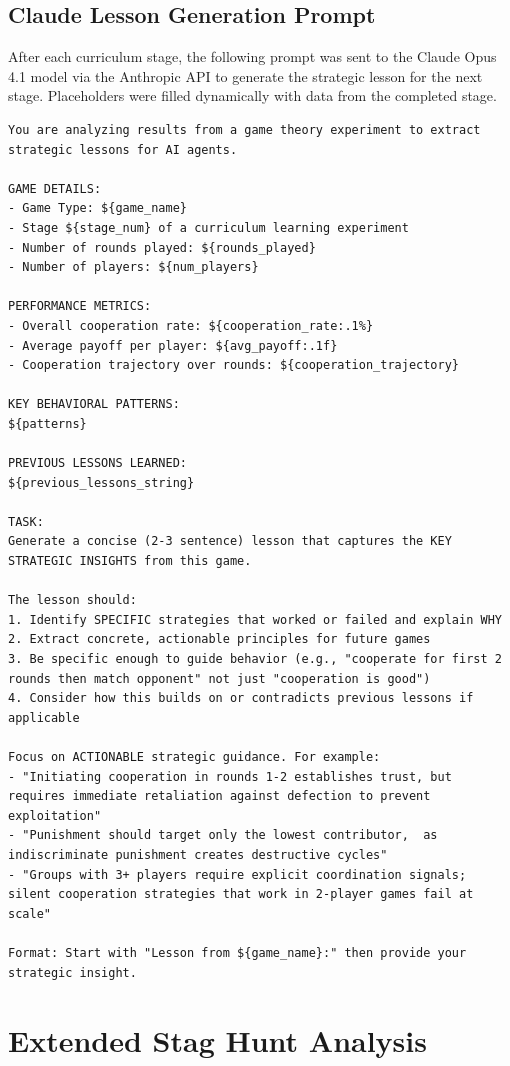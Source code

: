 \documentclass[11pt]{article}
\begin{document}
\subsection{Claude Lesson Generation Prompt}
\label{app:lesson_prompt}
After each curriculum stage, the following prompt was sent to the Claude Opus 4.1 model via the Anthropic API to generate the strategic lesson for the next stage. Placeholders were filled dynamically with data from the completed stage.

\begin{lstlisting}
You are analyzing results from a game theory experiment to extract strategic lessons for AI agents.

GAME DETAILS:
- Game Type: ${game_name}
- Stage ${stage_num} of a curriculum learning experiment
- Number of rounds played: ${rounds_played}
- Number of players: ${num_players}

PERFORMANCE METRICS:
- Overall cooperation rate: ${cooperation_rate:.1%}
- Average payoff per player: ${avg_payoff:.1f}
- Cooperation trajectory over rounds: ${cooperation_trajectory}

KEY BEHAVIORAL PATTERNS:
${patterns}

PREVIOUS LESSONS LEARNED:
${previous_lessons_string}

TASK:
Generate a concise (2-3 sentence) lesson that captures the KEY STRATEGIC INSIGHTS from this game.

The lesson should:
1. Identify SPECIFIC strategies that worked or failed and explain WHY
2. Extract concrete, actionable principles for future games
3. Be specific enough to guide behavior (e.g., "cooperate for first 2 rounds then match opponent" not just "cooperation is good")
4. Consider how this builds on or contradicts previous lessons if applicable

Focus on ACTIONABLE strategic guidance. For example:
- "Initiating cooperation in rounds 1-2 establishes trust, but requires immediate retaliation against defection to prevent exploitation"
- "Punishment should target only the lowest contributor,  as indiscriminate punishment creates destructive cycles"
- "Groups with 3+ players require explicit coordination signals;  silent cooperation strategies that work in 2-player games fail at scale"

Format: Start with "Lesson from ${game_name}:" then provide your strategic insight.
\end{lstlisting}

\section{Extended Stag Hunt Analysis}
\label{app:pilot_details}
\end{document}
